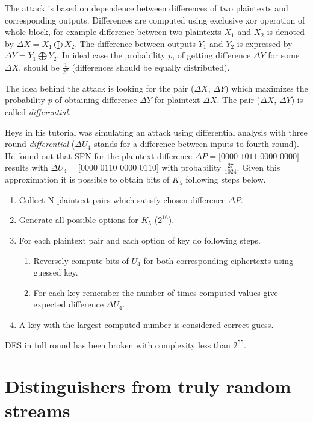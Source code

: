 \documentclass[
    digital,    %
    oneside,    %
    color,
    11pt,
    nocover,
    notable,
    nolof,
    nolot,
    final
]{fithesis3}
\renewcommand\_{\textunderscore\allowbreak}
\begin{document}
The attack is based on dependence between differences of two plaintexts and corresponding outputs. Differences are computed using exclusive xor operation of whole block, for example difference between two plaintexts $X_{1}$ and $X_{2}$ is denoted by $\Delta X = X_{1} \bigoplus X_{2}$. The difference between outputs $Y_{1}$ and $Y_{2}$ is expressed by $\Delta Y = Y_{1} \bigoplus Y_{2}$. In ideal case the probability $p$, of getting difference $\Delta Y$ for some  $\Delta X$, should be $\frac{1}{2^{n}}$ (differences should be equally distributed). 

The idea behind the attack is looking for the pair ($\Delta X$, $\Delta Y$) which maximizes the probability $p$ of obtaining difference $\Delta Y$ for plaintext $\Delta X$. The pair ($\Delta X$, $\Delta Y$) is called \textit{differential}.

Heys in his tutorial \cite{human-cryptanalysis} was simulating an attack using differential analysis with three round \textit{differential} ($\Delta U_{4}$ stands for a difference between inputs to fourth round). He found out that SPN for the plaintext difference $\Delta P = [0000$ $1011$ $0000$ $0000]$ results with $\Delta U_{4} = [0000$ $0110$ $0000$ $0110]$ with probability $\frac{27}{1024}$. Given this approximation it is possible to obtain bits of $K_{5}$ following steps below.

\begin{enumerate}
	\item Collect N plaintext pairs which satisfy chosen difference $\Delta P$.
	\item Generate all possible options for $K_{5}$ ($2^{16}$).
	\item For each plaintext pair and each option of key do following steps.
	\begin{enumerate}
		\item Reversely compute bits of $U_{4}$ for both corresponding ciphertexts using guessed key.
		\item For each key remember the number of times computed values give expected difference $\Delta U_{4}$.
	\end{enumerate}
	\item A key with the largest computed number is considered correct guess.
\end{enumerate}

DES in full round has been broken with complexity less than $2^{55}$. \cite{Biham1991}

\section{Distinguishers from truly random streams}
\label{sec:statistical-tests}
\end{document}
